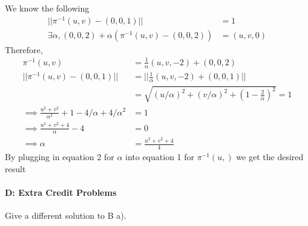 \documentclass[12pt,letterpaper,boxed]{hmcpset}
\begin{document}
\begin{itemize}
We know the following
\begin{align*}
  ||\pi^{-1}(u, v) - (0, 0, 1)|| &= 1 \\
  \exists \alpha, (0, 0, 2) + \alpha(\pi^{-1}(u, v) - (0, 0, 2)) &= (u, v, 0) 
\end{align*}
Therefore,
\begin{align*}
  \pi^{-1}(u, v) &= \frac{1}{\alpha}(u, v, -2) + (0, 0, 2) \tag*{eq 1} \\
  ||\pi^{-1}(u, v) - (0, 0, 1)|| &= ||\frac{1}{\alpha}(u, v, -2) + (0, 0, 1)|| \\
               &= \sqrt{(u/\alpha)^2 + (v/\alpha)^2 + (1  - \frac{2}{\alpha})^2} = 1 \\
  \implies \frac{u^2 + v^2}{\alpha^2} + 1 - 4/\alpha + 4/\alpha^2 &= 1 \\
  \implies \frac{u^2 + v^2 + 4}{\alpha} - 4 &= 0 \\
  \implies \alpha &= \frac{u^2 + v^2 + 4}{4} \tag*{eq 2}
\end{align*}
By plugging in equation 2 for $\alpha$ into equation 1 for $\pi^{-1}(u, )$ we get the desired result
\end{itemize}

\paragraph{D: Extra Credit Problems}
\begin{itemize}
{\item Give a different solution to B a).}
\end{itemize}
\end{document}
